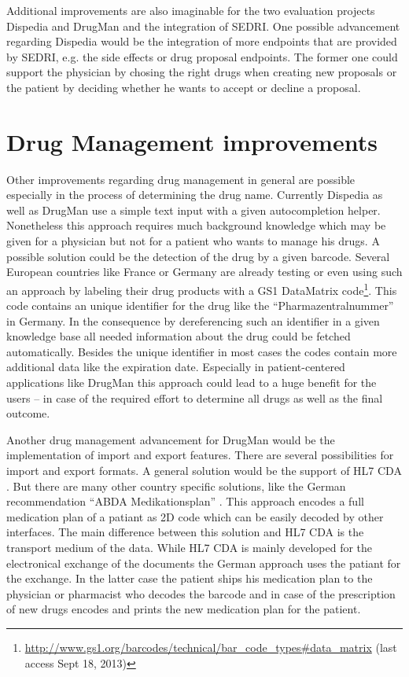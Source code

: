 Additional improvements are also imaginable for the two evaluation projects Dispedia and DrugMan and the integration of SEDRI.
One possible advancement regarding Dispedia would be the integration of more endpoints that are provided by SEDRI, e.g. the side effects or drug proposal endpoints.
The former one could support the physician by chosing the right drugs when creating new proposals or the patient by deciding whether he wants to accept or decline a proposal.

\section*{Drug Management improvements}
\label{sec:drug-manag-impr}

Other improvements regarding drug management in general are possible especially in the process of determining the drug name.
Currently Dispedia as well as DrugMan use a simple text input with a given autocompletion helper.
Nonetheless this approach requires much background knowledge which may be given for a physician but not for a patient who wants to manage his drugs.
A possible solution could be the detection of the drug by a given barcode.
Several European countries like France or Germany are already testing or even using such an approach by labeling their drug products with a GS1 DataMatrix code\footnote{\url{http://www.gs1.org/barcodes/technical/bar_code_types\#data_matrix} (last access Sept 18, 2013)}.
This code contains an unique identifier for the drug like the ``Pharmazentralnummer'' in Germany.
In the consequence by dereferencing such an identifier in a given knowledge base all needed information about the drug could be fetched automatically.
Besides the unique identifier in most cases the codes contain more additional data like the expiration date.
Especially in patient-centered applications like DrugMan this approach could lead to a huge benefit for the users -- in case of the required effort to determine all drugs as well as the final outcome.

Another drug management advancement for DrugMan would be the implementation of import and export features.
There are several possibilities for import and export formats.
A general solution would be the support of HL7 CDA \cite{dolin2001hl7}.
But there are many other country specific solutions, like the German recommendation ``ABDA Medikationsplan'' \cite{abdamedplan}.
This approach encodes a full medication plan of a patiant as 2D code which can be easily decoded by other interfaces.
The main difference between this solution and HL7 CDA is the transport medium of the data.
While HL7 CDA is mainly developed for the electronical exchange of the documents the German approach uses the patiant for the exchange.
In the latter case the patient ships his medication plan to the physician or pharmacist who decodes the barcode and in case of the prescription of new drugs encodes and prints the new medication plan for the patient.

